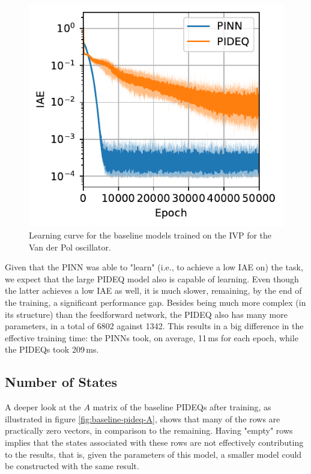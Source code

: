 \begin{figure}[h]
    \centering
	\includegraphics{images/exp_1_iae.pdf}
    \caption{Learning curve for the baseline models trained on the \gls{IVP} for the Van der Pol oscillator.}
    \label{fig:images-exp_1_iae-pdf}
\end{figure}

Given that the \gls{PINN} was able to "learn" (i.e., to achieve a low IAE on) the task, we expect that the large \gls{PIDEQ} model also is capable of learning.
Even though the latter achieves a low IAE as well, it is much slower, remaining, by the end of the training, a significant performance gap.
Besides being much more complex (in its structure) than the feedforward network, the \gls{PIDEQ} also has many more parameters, in a total of 6802 against 1342.
This results in a big difference in the effective training time: the \gls{PINN}s took, on average, 11\,ms for each epoch, while the \gls{PIDEQ}s took 209\,ms.

\subsection{Number of States}

A deeper look at the $A$ matrix of the baseline \gls{PIDEQ}s after training, as illustrated in figure \ref{fig:baseline-pideq-A}, shows that many of the rows are practically zero vectors, in comparison to the remaining.
Having "empty" rows implies that the states associated with these rows are not effectively contributing to the results, that is, given the parameters of this model, a smaller model could be constructed with the same result.  

